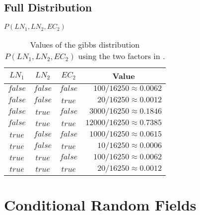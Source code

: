 \subsection{Full Distribution}\label{app:subsec-gd-full-distribution}
\begin{table}[H]
\centering
$P(LN_1,LN_2,EC_2)$\par
\smallskip
\begin{tabular}{c c c r}
 \toprule
 $LN_1$ & $LN_2$ & $EC_2$ & \multicolumn{1}{c}{Value} \\
 \midrule
 $\mathit{false}$ & $\mathit{false}$ & $\mathit{false}$ & $\num{100}/\num{16250}\approx0.0062$\\
 $\mathit{false}$ & $\mathit{false}$ & $\mathit{true}$  & $\num{20}/\num{16250}\approx0.0012$\\
 $\mathit{false}$ & $\mathit{true}$  & $\mathit{false}$ & $\num{3000}/\num{16250}\approx0.1846$\\
 $\mathit{false}$ & $\mathit{true}$  & $\mathit{true}$  & $\num{12000}/\num{16250}\approx0.7385$\\
 $\mathit{true}$  & $\mathit{false}$ & $\mathit{false}$ & $\num{1000}/\num{16250}\approx0.0615$\\
 $\mathit{true}$  & $\mathit{false}$ & $\mathit{true}$  & $\num{10}/\num{16250}\approx0.0006$\\
 $\mathit{true}$  & $\mathit{true}$  & $\mathit{false}$ & $\num{100}/\num{16250}\approx0.0062$\\
 $\mathit{true}$  & $\mathit{true}$  & $\mathit{true}$  & $\num{20}/\num{16250}\approx0.0012$\\
 \bottomrule
\end{tabular}
\caption{Values of the \Gls{gibbs distribution} $P(LN_1,LN_2,EC_2)$ using the two \glspl{factor} in .}
\label{tab:example-factor-product}
\end{table}
\section{Conditional Random Fields}\label{app:sec-conditional-random-fields}
